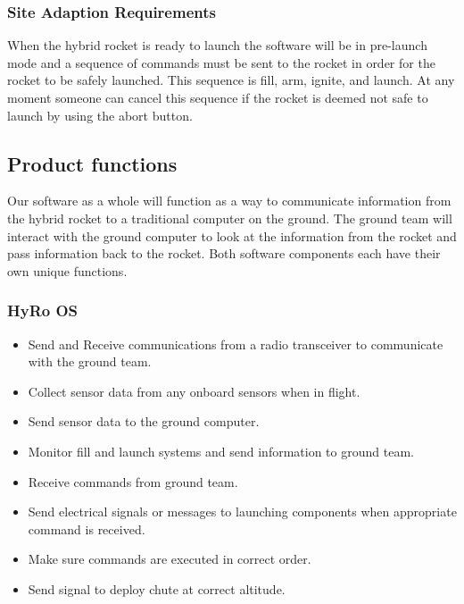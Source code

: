 \documentclass[10pt,draftclsnofoot,onecolumn,retainorgcmds]{IEEEtran}
\begin{document}
\subsubsection{Site Adaption Requirements}
When the hybrid rocket is ready to launch the software will be in pre-launch mode and a sequence of commands must be sent to the rocket in order for the rocket to be safely launched. This sequence is fill, arm, ignite, and launch. At any moment someone can cancel this sequence if the rocket is deemed not safe to launch by using the abort button.

\subsection{ Product functions}
Our software as a whole will function as a way to communicate information from the hybrid rocket to a traditional computer on the ground. The ground team will interact with the ground computer to look at the information from the rocket and pass information back to the rocket. Both software components each have their own unique functions.

\subsubsection{HyRo OS}
\begin{itemize}
	\item Send and Receive communications from a radio transceiver to communicate with the ground team.
	\item Collect sensor data from any onboard sensors when in flight.
	\item Send sensor data to the ground computer.
	\item Monitor fill and launch systems and send information to ground team.
	\item Receive commands from ground team.
	\item Send electrical signals or messages to launching components when appropriate command is received.
	\item Make sure commands are executed in correct order.
	\item Send signal to deploy chute at correct altitude.
\end{itemize}
\end{document}

